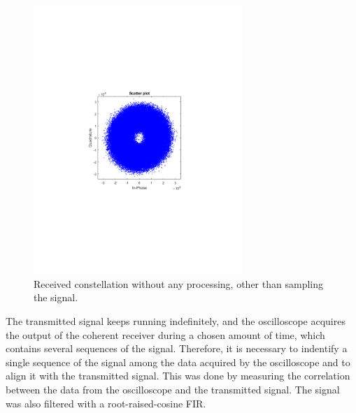 \begin{refsection}
\begin{figure}[H]
	\centering
	\includegraphics[clip, trim=4cm 8cm 4cm 8cm, width=0.7\textwidth]{./sdf/m_qam_system/figures/exp/const-rtx-sps.pdf}
	\caption{Received constellation without any processing, other than sampling the signal.}
	\label{fig:rxConst}
\end{figure}

The transmitted signal keeps running indefinitely, and the oscilloscope acquires the output of the coherent receiver during a chosen amount of time, which contains several sequences of the signal. Therefore, it is necessary to indentify a single sequence of the signal among the data acquired by the oscilloscope and to align it with the transmitted signal. This was done by measuring the correlation between the data from the oscilloscope and the transmitted signal. The signal was also filtered with a root-raised-cosine FIR.


\end{refsection}
